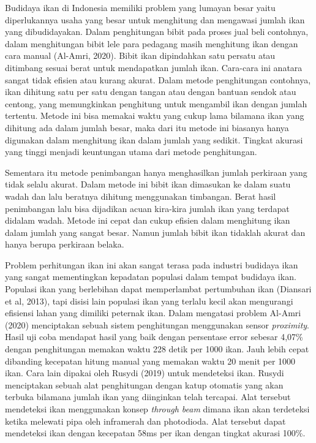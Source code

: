 Budidaya ikan di Indonesia memiliki problem yang lumayan besar yaitu 
diperlukannya usaha yang besar untuk menghitung dan mengawasi jumlah ikan 
yang dibudidayakan. Dalam penghitungan bibit pada proses jual beli contohnya, 
dalam menghitungan bibit lele para pedagang masih menghitung ikan dengan 
cara manual (Al-Amri, 2020). Bibit ikan dipindahkan satu persatu atau 
ditimbang sesuai berat untuk mendapatkan jumlah ikan. Cara-cara ini anatara sangat tidak 
efisien atau kurang akurat. Dalam metode penghitungan contohnya, ikan 
dihitung satu per satu dengan tangan atau dengan bantuan sendok atau centong, 
yang memungkinkan penghitung untuk mengambil ikan dengan jumlah tertentu. 
Metode ini bisa memakai waktu yang cukup lama bilamana ikan yang dihitung 
ada dalam jumlah besar, maka dari itu metode ini biasanya hanya digunakan 
dalam menghitung ikan dalam jumlah yang sedikit. Tingkat akurasi yang 
tinggi menjadi keuntungan utama dari metode penghitungan.

Sementara itu metode penimbangan hanya menghasilkan jumlah perkiraan yang tidak 
selalu akurat. Dalam metode ini bibit ikan dimasukan ke dalam suatu wadah dan lalu 
beratnya dihitung menggunakan timbangan. Berat hasil penimbangan lalu bisa 
dijadikan acuan kira-kira jumlah ikan yang terdapat didalam wadah. 
Metode ini cepat dan cukup efisien dalam menghitung ikan dalam jumlah yang 
sangat besar. Namun jumlah bibit ikan tidaklah akurat dan hanya berupa perkiraan belaka.

Problem perhitungan ikan ini akan sangat terasa pada industri budidaya ikan yang 
sangat mementingkan kepadatan populasi dalam tempat budidaya ikan. Populasi ikan 
yang berlebihan dapat memperlambat pertumbuhan ikan (Diansari et al, 2013), tapi 
disisi lain populasi ikan yang terlalu kecil akan mengurangi efisiensi lahan 
yang dimiliki peternak ikan. Dalam mengatasi problem Al-Amri (2020) menciptakan 
sebuah sistem penghitungan menggunakan sensor \emph{proximity}. Hasil uji coba mendapat 
hasil yang baik dengan persentase error sebesar 4,07\% dengan penghitungan 
memakan waktu 228 detik per 1000 ikan. Jauh lebih cepat dibanding kecepatan 
hitung manual yang memakan waktu 20 menit per 1000 ikan. Cara lain dipakai 
oleh Rusydi (2019) untuk mendeteksi ikan. Rusydi menciptakan sebuah alat 
penghitungan dengan katup otomatis yang akan terbuka bilamana jumlah ikan 
yang diinginkan telah tercapai. Alat tersebut mendeteksi ikan menggunakan 
konsep \emph{through beam} dimana ikan akan terdeteksi ketika melewati pipa oleh 
inframerah dan photodioda. Alat tersebut dapat mendeteksi ikan dengan 
kecepatan 58ms per ikan dengan tingkat akurasi 100\%.

